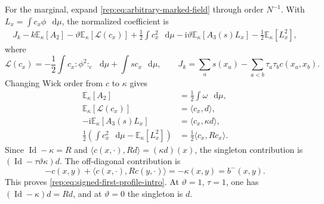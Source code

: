 \documentclass[11pt,reqno]{amsart}
\numberwithin{equation}{section}
\theoremstyle{plain}
\theoremstyle{definition}
\newcommand{\dd}{\mathop{}\!\mathrm d}
\newcommand{\E}{\mathbb E}
\newcommand{\Id}{\operatorname{Id}}
\begin{document}
For the marginal, expand \eqref{rep:eq:arbitrary-marked-field} through order $N^{-1}$.  With $L_x=\int c_x\phi\,\dd\mu$, the normalized coefficient is
\begin{multline}\label{rep:eq:arbitrary-f1-pre}
 J_k-k\E_\kappa[A_2]-\vartheta\E_\kappa[\mathcal L(c_x)]
 +\frac12\int c_x^2\,\dd\mu
 -\mathrm{i}\vartheta\E_\kappa[A_3(s)L_x]
 -\frac12\E_\kappa[L_x^2],
\end{multline}
where
\begin{equation}\label{rep:eq:arbitrary-L-J}
 \mathcal L(c_x)=-\frac12\int c_x:\!\phi^2\!:_c\,\dd\mu
 +\int sc_x\,\dd\mu,
 \qquad
 J_k=\sum_as(x_a)-\sum_{a<b}\tau_a\tau_bc(x_a,x_b).
\end{equation}
Changing Wick order from $c$ to $\kappa$ gives
\begin{align}
 \E_\kappa[A_2]&=\frac12\int\omega\,\dd\mu,\label{rep:eq:arbitrary-EA2}\\
 \E_\kappa[\mathcal L(c_x)]&=\langle c_x,d\rangle,\label{rep:eq:arbitrary-EL}\\
 -\mathrm{i}\E_\kappa[A_3(s)L_x]&=\langle c_x,\kappa d\rangle,\label{rep:eq:arbitrary-cross}\\
 \frac12\left(\int c_x^2\,\dd\mu-\E_\kappa[L_x^2]\right)
 &=\frac12\langle c_x,Rc_x\rangle.
 \label{rep:eq:arbitrary-quadratic-mark}
\end{align}
Since $\Id-\kappa=R$ and $\langle c(x,\cdot),Rd\rangle=(\kappa d)(x)$, the singleton contribution is $(\Id-\tau\vartheta\kappa)d$.  The off-diagonal contribution is
\begin{equation}\label{rep:eq:arbitrary-pair-profile}
 -c(x,y)+\langle c(x,\cdot),Rc(y,\cdot)\rangle
 =-\kappa(x,y)=b^-(x,y).
\end{equation}
This proves \eqref{rep:eq:signed-first-profile-intro}.  At $\vartheta=1$, $\tau=1$, one has $(\Id-\kappa)d=Rd$, and at $\vartheta=0$ the singleton is $d$.
\end{document}

